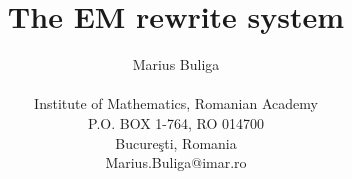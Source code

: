 \documentclass{article}
\begin{document}

























\pagestyle{plain}










\newtheorem{theorem}{Theorem}[section]

\newtheorem{proposition}[theorem]{Proposition}

\newtheorem{lema}[theorem]{Lemma}

\newtheorem{corollary}[theorem]{Corollary}

\newtheorem{definition}[theorem]{Definition}

\newtheorem{remark}[theorem]{Remark}

\newtheorem{exempl}{Example}[section]

\newenvironment{example}{\begin{exempl}  \em}{\hfill $\square$

\end{exempl}}  \vspace{.5cm}









\renewcommand{\contentsname}{ }




\title{The EM rewrite system}

\author{Marius Buliga \\ 
\\
Institute of Mathematics, Romanian Academy \\
P.O. BOX 1-764, RO 014700\\
Bucure\c sti, Romania\\
{\footnotesize Marius.Buliga@imar.ro}}  \vspace{.5cm}
\end{document}
